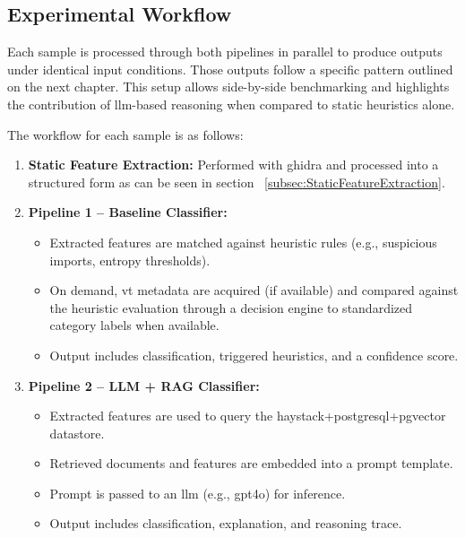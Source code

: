 \subsection{Experimental Workflow}\label{subsec:ExperimentalWorkflow}
Each sample is processed through both pipelines in parallel to produce outputs under identical
input conditions. Those outputs follow a specific pattern outlined on the next chapter. This setup
allows side-by-side benchmarking and highlights the contribution of \gls{llm}-based reasoning when
compared to static heuristics alone.

The workflow for each sample is as follows:
\begin{enumerate}
      \item \textbf{Static Feature Extraction:} Performed with \gls{ghidra} and
            processed into a structured form as can be seen in section ~\ref{subsec:StaticFeatureExtraction}.

      \item \textbf{Pipeline 1 -- Baseline Classifier:}
            \begin{itemize}
                  \item Extracted features are matched against heuristic rules (e.g., suspicious imports, entropy
                        thresholds).
                  \item On demand, \gls{vt} metadata are acquired (if available) and compared against the heuristic
                        evaluation through a decision engine to standardized category labels when available.
                  \item Output includes classification, triggered heuristics, and a confidence score.
            \end{itemize}

      \item \textbf{Pipeline 2 -- LLM + RAG Classifier:}
            \begin{itemize}
                  \item Extracted features are used to query the \gls{haystack}+\gls{postgresql}+\gls{pgvector} datastore.
                  \item Retrieved documents and features are embedded into a prompt template.
                  \item Prompt is passed to an \gls{llm} (e.g., \gls{gpt4o}) for inference.
                  \item Output includes classification, explanation, and reasoning trace.
            \end{itemize}


\end{enumerate}
